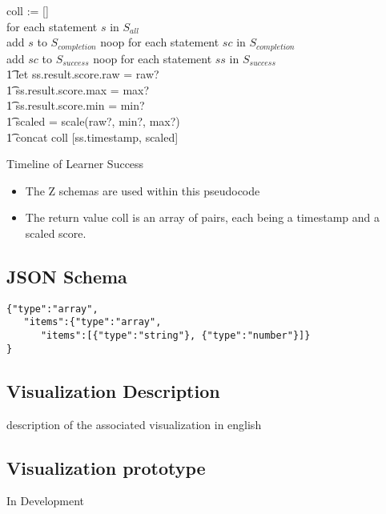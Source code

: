 \documentclass{article}
\begin{document}
  \begin{algorithm}[H]
    \SetAlgoLined
    coll := [] \\
     {
      for each statement $s$ in $S_{all}$ \\
      {
        add $s$ to $S_{completion}$
      }
      {
        noop
      }}
     {
      for each statement $sc$ in $S_{completion}$ \\
      {
        add $sc$ to $S_{success}$
      }
      {
        noop
      }}
     {
      for each statement $ss$ in $S_{success}$ \\
      \t1 let ss.result.score.raw = raw? \\ \t1 \:\:\:\:\:
          ss.result.score.max = max? \\ \t1 \:\:\:\:\:
          ss.result.score.min = min? \\ \t1 \:\:\:\:\:
          scaled = scale(raw?, min?, max?) \\
       \t1 concat coll [ss.timestamp, scaled]
    }
    \caption{Timeline of Learner Success}
  \end{algorithm}
  \begin{itemize}
    \item The Z schemas are used within this pseudocode
    \item The return value coll is an array of pairs, each being a
      timestamp and a scaled score.
  \end{itemize}

  \subsection{JSON Schema}
\begin{lstlisting}[style=json]
{"type":"array",
   "items":{"type":"array",
      "items":[{"type":"string"}, {"type":"number"}]}
}
\end{lstlisting}

  \subsection{Visualization Description}

  description of the associated visualization in english
  \subsection{Visualization prototype}
  In Development
\end{document}
